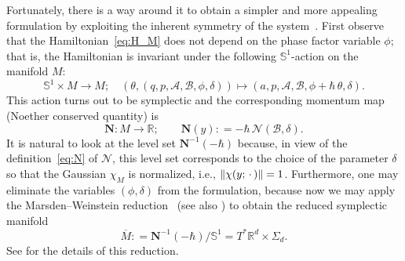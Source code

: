 \documentclass[10pt]{article}
\def\defeq{\mathrel{\mathop:}=}
\begin{document}
Fortunately, there is a way around it to obtain a simpler and more appealing formulation by exploiting the inherent symmetry of the system~\cite[Section~4]{OhLe2013}.
First observe that the Hamiltonian~\eqref{eq:H_M} does not depend on the phase factor variable $\phi$; that is, the Hamiltonian is invariant under the following $\mathbb{S}^{1}$-action on the manifold $M$:
\begin{equation*}
  \mathbb{S}^{1} \times M \to M;
  \quad
  \left( \theta, (q, p, \mathcal{A}, \mathcal{B}, \phi, \delta) \right) \mapsto (a, p, \mathcal{A}, \mathcal{B}, \phi + \hbar\,\theta, \delta).
\end{equation*}
This action turns out to be symplectic and the corresponding momentum map (Noether conserved quantity) is
\begin{equation*}
  \mathbf{N}\colon M \to \mathbb{R};
  \qquad
  \mathbf{N}(y) \defeq -\hbar\,\mathcal{N}(\mathcal{B},\delta).
\end{equation*}
It is natural to look at the level set $\mathbf{N}^{-1}(-\hbar)$ because, in view of the definition~\eqref{eq:N} of $\mathcal{N}$, this level set corresponds to the choice of the parameter $\delta$ so that the Gaussian $\chi_{M}$ is normalized, i.e., $\norm{\chi(y;\,\cdot\,)} = 1$.
Furthermore, one may eliminate the variables $(\phi,\delta)$ from the formulation, because now we may apply the Marsden--Weinstein reduction~\cite{MaWe1974} (see also \citet[Sections~1.1 and 1.2]{MaMiOrPeRa2007}) to obtain the reduced symplectic manifold
\begin{equation*}
  \overline{M} \defeq \mathbf{N}^{-1}(-\hbar)/\mathbb{S}^{1} = T^{*}\mathbb{R}^{d} \times \Sigma_{d}.
\end{equation*}
See \cite[Section~4]{OhLe2013} for the details of this reduction.
\end{document}
